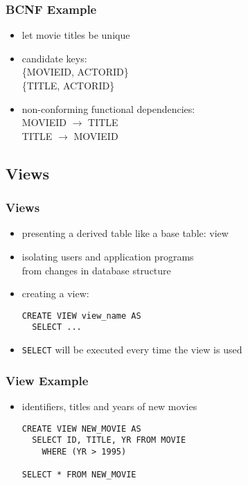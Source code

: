 \documentclass[dvipsnames]{beamer}
\begin{document}
\begin{frame}
  \frametitle{BCNF Example}

  \hyperlink{example_db_1}{}

  \begin{itemize}
    \item let movie titles be unique
    \item candidate keys:\\
      \{MOVIEID, ACTORID\}\\
      \{TITLE, ACTORID\}

    \pause
    \medskip
    \item non-conforming functional dependencies:\\
      MOVIEID $\rightarrow$ TITLE\\
      TITLE $\rightarrow$ MOVIEID
  \end{itemize}
\end{frame}

\subsection{Views}

\lstset{language=ExtendedSQL}

\begin{frame}[fragile]
  \frametitle{Views}

  \begin{itemize}
    \item presenting a derived table like a base table: \alert{view}
    \item isolating users and application programs\\
      from changes in database structure

    \pause
    \bigskip
    \item creating a view:
    \begin{lstlisting}
CREATE VIEW view_name AS
  SELECT ...
    \end{lstlisting}

    \medskip
    \item \lstinline!SELECT! will be executed every time the view is used
  \end{itemize}
\end{frame}

\begin{frame}[fragile]
  \frametitle{View Example}

  \begin{itemize}
    \item identifiers, titles and years of new movies

    \medskip
    \begin{lstlisting}
CREATE VIEW NEW_MOVIE AS
  SELECT ID, TITLE, YR FROM MOVIE
    WHERE (YR > 1995)

SELECT * FROM NEW_MOVIE
    \end{lstlisting}
  \end{itemize}
\end{frame}
\end{document}
